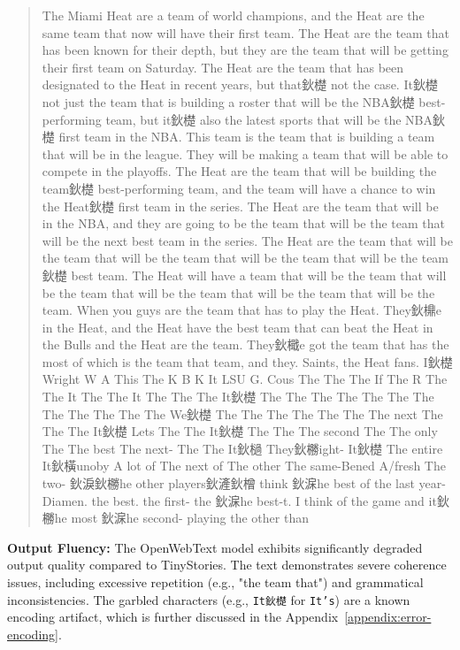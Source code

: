 \begin{answer}
\begin{quote}
The Miami Heat are a team of world champions, and the Heat are the same team that now will have their first team. The Heat are the team that has been known for their depth, but they are the team that will be getting their first team on Saturday. The Heat are the team that has been designated to the Heat in recent years, but that鈥檚 not the case. It鈥檚 not just the team that is building a roster that will be the NBA鈥檚 best-performing team, but it鈥檚 also the latest sports that will be the NBA鈥檚 first team in the NBA. This team is the team that is building a team that will be in the league. They will be making a team that will be able to compete in the playoffs. The Heat are the team that will be building the team鈥檚 best-performing team, and the team will have a chance to win the Heat鈥檚 first team in the series. The Heat are the team that will be in the NBA, and they are going to be the team that will be the team that will be the next best team in the series. The Heat are the team that will be the team that will be the team that will be the team that will be the team鈥檚 best team. The Heat will have a team that will be the team that will be the team that will be the team that will be the team that will be the team. When you guys are the team that has to play the Heat. They鈥檙e in the Heat, and the Heat have the best team that can beat the Heat in the Bulls and the Heat are the team. They鈥檝e got the team that has the most of which is the team that team, and they. Saints, the Heat fans. I鈥檚 Wright W A This The K B K It LSU G. Cous The The The If The R The The It The The It The The The It鈥檚 The The The The The The The The The The The The We鈥檚 The The The The The The The next The The The It鈥檚 Lets The The It鈥檚 The The The second The The only The The best The next- The The It鈥檛 They鈥橳ight- It鈥檚 The entire It鈥橫unoby A lot of The next of The other The same-Bened A/fresh The two- 鈥淚鈥橳he other players鈥滻鈥橧 think 鈥淭he best of the last year-Diamen. the best. the first- the 鈥淭he best-t. I think of the game and it鈥橳he most 鈥淭he second- playing the other than
\end{quote}

\textbf{Output Fluency:} The OpenWebText model exhibits significantly degraded output quality compared to TinyStories. The text demonstrates severe coherence issues, including excessive repetition (e.g., "the team that") and grammatical inconsistencies. The garbled characters (e.g., \lstinline{It鈥檚} for \lstinline{It’s}) are a known encoding artifact, which is further discussed in the Appendix~\ref{appendix:error-encoding}.


\end{answer}
